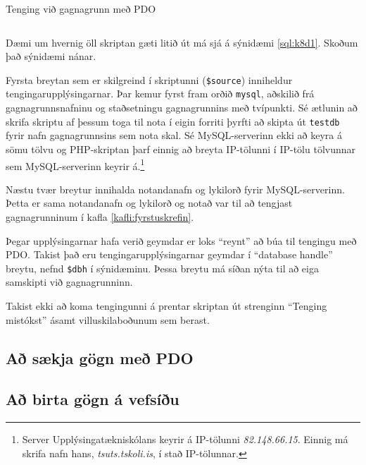 \begin{example}[h]
\caption{Tenging við gagnagrunn með PDO}
\label{sql:k8d1}
\centering
\inputminted[frame=lines, fontfamily=courier]{php}{sql/k8d1.php}
\end{example}

Dæmi um hvernig öll skriptan gæti litið út má sjá á sýnidæmi \ref{sql:k8d1}. Skoðum það sýnidæmi nánar. 

Fyrsta breytan sem er skilgreind í skriptunni (\verb|$source|) inniheldur tengingarupplýsingarnar. Þar kemur fyrst fram orðið \verb|mysql|, aðskilið frá gagnagrunnsnafninu og staðsetningu gagnagrunnins með tvípunkti. Sé ætlunin að skrifa skriptu af þessum toga til nota í eigin forriti þyrfti að skipta út \verb|testdb| fyrir nafn gagnagrunnsins sem nota skal. Sé MySQL-serverinn ekki að keyra á sömu tölvu og PHP-skriptan þarf einnig að breyta IP-tölunni í IP-tölu tölvunnar sem MySQL-serverinn keyrir á.\footnote{Server Upplýsingatækniskólans keyrir á IP-tölunni \emph{82.148.66.15}. Einnig má skrifa nafn hans, \emph{tsuts.tskoli.is}, í stað IP-tölunnar.}

Næstu tvær breytur innihalda notandanafn og lykilorð fyrir MySQL-serverinn. Þetta er sama notandanafn og lykilorð og notað var til að tengjast gagnagrunninum í kafla \ref{kafli:fyrstuskrefin}.

Þegar upplýsingarnar hafa verið geymdar er loks ``reynt'' að búa til tengingu með PDO. Takist það eru tengingarupplýsingarnar geymdar í  ``database handle'' breytu, nefnd \verb|$dbh| í sýnidæminu. Þessa breytu má síðan nýta til að eiga samskipti við gagnagrunninn.

Takist ekki að koma tengingunni á prentar skriptan út strenginn ``Tenging mistókst'' ásamt villuskilaboðunum sem berast.
\subsection{Að sækja gögn með PDO}
\subsection{Að birta gögn á vefsíðu}